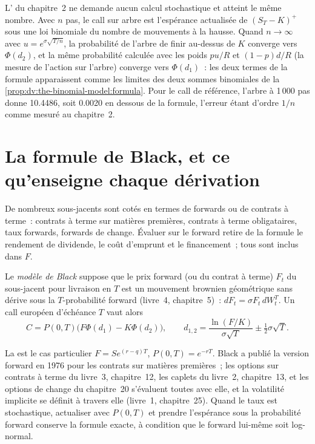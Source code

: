 L' du chapitre~2 ne demande aucun calcul stochastique et
atteint le même nombre. Avec $n$ pas, le call sur arbre est l'espérance actualisée de
$(S_T-K)^+$ sous une loi binomiale du nombre de mouvements à la hausse. Quand
$n\to\infty$ avec $u=e^{\sigma\sqrt{T/n}}$, la probabilité de l'arbre de finir au-dessus de
$K$ converge vers $\Phi(d_2)$, et la même probabilité calculée avec les poids
$pu/R$ et $(1-p)d/R$ (la mesure de l'action sur l'arbre) converge vers
$\Phi(d_1)$~: les deux termes de la formule apparaissent comme les limites des deux sommes binomiales de la
\cref{prop:dv:the-binomial-model:formula}. Pour le call de référence, l'arbre à
1\,000 pas donne 10.4486, soit 0.0020 en dessous de la formule, l'erreur étant d'ordre
$1/n$ comme mesuré au chapitre~2.

\section{La formule de Black, et ce qu'enseigne chaque dérivation}

De nombreux sous-jacents sont cotés en termes de forwards ou de contrats à terme~: contrats à terme sur matières premières,
contrats à terme obligataires, taux forwards, forwards de change. Évaluer sur le forward retire de la formule le
rendement de dividende, le coût d'emprunt et le financement~; tous sont
inclus dans $F$.

\begin{definition}\label{def:dv:black-scholes-three-ways:black}
Le \emph{modèle de Black} suppose que le prix forward (ou du contrat à terme)
$F_t$ du sous-jacent pour livraison en $T$ est un mouvement brownien géométrique
sans dérive sous la $T$-probabilité forward (livre~4, chapitre~5)~:
$dF_t=\sigma F_t\,dW^T_t$. Un call européen d'échéance $T$ vaut alors
\[
C=P(0,T)\bigl(F\Phi(d_1)-K\Phi(d_2)\bigr),\qquad d_{1,2}=\frac{\ln(F/K)}{\sigma\sqrt T}\pm\tfrac12\sigma\sqrt T .
\]
\end{definition}

La  est le cas particulier $F=Se^{(r-q)T}$,
$P(0,T)=e^{-rT}$. Black a publié la version forward en 1976 pour les
contrats sur matières premières~; les options sur contrats à terme du livre~3, chapitre~12, les caplets
du livre~2, chapitre~13, et les options de change du chapitre~20 s'évaluent toutes
avec elle, et la volatilité implicite se définit à travers elle (livre~1,
chapitre~25). Quand le taux est stochastique, actualiser avec $P(0,T)$ et prendre
l'espérance sous la probabilité forward conserve la formule exacte, à condition que
le forward lui-même soit log-normal.

